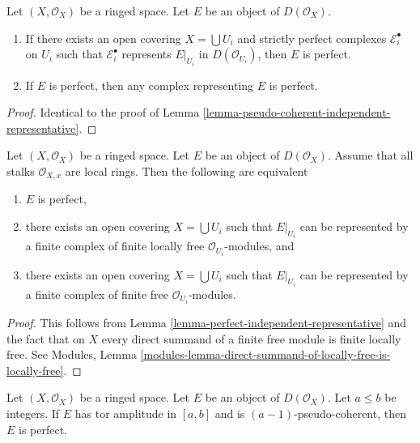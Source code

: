 \begin{lemma}
\label{lemma-perfect-independent-representative}
Let $(X, \mathcal{O}_X)$ be a ringed space.
Let $E$ be an object of $D(\mathcal{O}_X)$.
\begin{enumerate}
\item If there exists an open covering $X = \bigcup U_i$ and
strictly perfect complexes $\mathcal{E}_i^\bullet$ on $U_i$
such that $\mathcal{E}_i^\bullet$ represents $E|_{U_i}$ in
$D(\mathcal{O}_{U_i})$, then $E$ is perfect.
\item If $E$ is perfect, then any complex representing $E$ is perfect.
\end{enumerate}
\end{lemma}

\begin{proof}
Identical to the proof of
Lemma \ref{lemma-pseudo-coherent-independent-representative}.
\end{proof}

\begin{lemma}
\label{lemma-perfect-on-locally-ringed}
Let $(X, \mathcal{O}_X)$ be a ringed space. Let $E$ be an object of
$D(\mathcal{O}_X)$. Assume that all stalks $\mathcal{O}_{X, x}$
are local rings. Then the following are equivalent
\begin{enumerate}
\item $E$ is perfect,
\item there exists an open covering $X = \bigcup U_i$ such that
$E|_{U_i}$ can be represented by a finite complex of finite locally
free $\mathcal{O}_{U_i}$-modules, and
\item there exists an open covering $X = \bigcup U_i$ such that
$E|_{U_i}$ can be represented by a finite complex of finite
free $\mathcal{O}_{U_i}$-modules.
\end{enumerate}
\end{lemma}

\begin{proof}
This follows from Lemma \ref{lemma-perfect-independent-representative}
and the fact that on $X$ every direct summand of a finite free module
is finite locally free. See Modules, Lemma
\ref{modules-lemma-direct-summand-of-locally-free-is-locally-free}.
\end{proof}

\begin{lemma}
\label{lemma-perfect-precise}
Let $(X, \mathcal{O}_X)$ be a ringed space.
Let $E$ be an object of $D(\mathcal{O}_X)$.
Let $a \leq b$ be integers. If $E$ has tor amplitude in $[a, b]$
and is $(a - 1)$-pseudo-coherent, then $E$ is perfect.
\end{lemma}

